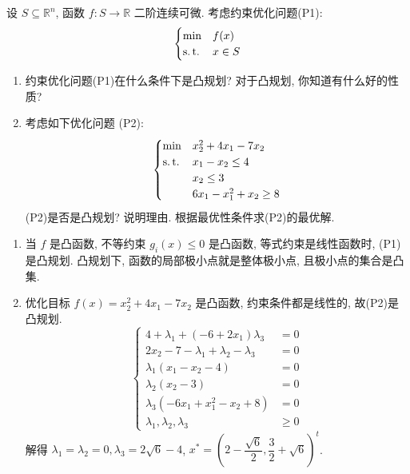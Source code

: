 \begin{Problem}
    设 $S \subseteq \mathbb{R}^n$, 函数 $f: S \to \mathbb{R}$ 二阶连续可微. 考虑约束优化问题(P1):
    \[\begin{cases}
        \min & f(x)\\
        \operatorname{s.t.} & x \in S
    \end{cases}\]
    \begin{enumerate}
        \item 约束优化问题(P1)在什么条件下是凸规划? 对于凸规划, 你知道有什么好的性质? 
        \item 考虑如下优化问题 (P2):\[\begin{cases}
            \min & x_2^2 + 4x_1 - 7x_2\\
            \operatorname{s.t.} & x_1 - x_2 \le 4\\
            &x_2 \le 3\\
            &6x_1 - x_1^2 + x_2 \ge 8
        \end{cases}\]
        (P2)是否是凸规划? 说明理由. 根据最优性条件求(P2)的最优解.
    \end{enumerate}

    \Answer \text{}\begin{enumerate}
        \item 当 $f$ 是凸函数, 不等约束 $g_i(x) \le 0$ 是凸函数, 等式约束是线性函数时, (P1) 是凸规划. 凸规划下, 函数的局部极小点就是整体极小点, 且极小点的集合是凸集.
        \item 优化目标 $f(x) = x_2^2 + 4x_1 - 7x_2$ 是凸函数, 约束条件都是线性的, 故(P2)是凸规划.
        \[\begin{cases}
            4 + \lambda_1 + (-6 + 2x_1)\lambda_3 &= 0\\
            2x_2 - 7 - \lambda_1 + \lambda_2 - \lambda_3 &= 0\\
            \lambda_1(x_1 - x_2 - 4) &= 0\\
            \lambda_2(x_2 - 3) &= 0\\
            \lambda_3(-6x_1 + x_1^2 - x_2 + 8) &= 0\\
            \lambda_1, \lambda_2, \lambda_3 &\ge 0
        \end{cases}\]
        解得 $\lambda_1 = \lambda_2 = 0, \lambda_3 = 2\sqrt{6} - 4$, $x^* = \left(2 - \dfrac{\sqrt{6}}{2}, \dfrac{3}{2} + \sqrt{6}\right)^t$.
    \end{enumerate}
\end{Problem}

